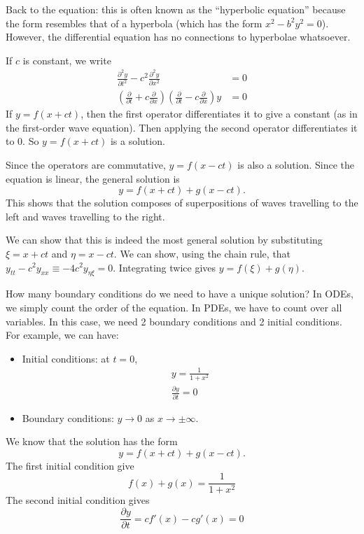 \documentclass[a4paper]{article}
\begin{document}
    Back to the equation: this is often known as the ``hyperbolic equation'' because the form resembles that of a hyperbola (which has the form $x^2 - b^2 y^2 = 0$). However, the differential equation has no connections to hyperbolae whatsoever.

    If $c$ is constant, we write
    \begin{align*}
      \frac{\partial ^2 y}{\partial t^2} - c^2 \frac{\partial^2 y}{\partial x^2} &= 0\\
      \left(\frac{\partial}{\partial t} + c\frac{\partial}{\partial x}\right)\left(\frac{\partial}{\partial t} - c\frac{\partial}{\partial x}\right) y &= 0
    \end{align*}
    If $y = f(x + ct)$, then the first operator differentiates it to give a constant (as in the first-order wave equation). Then applying the second operator differentiates it to $0$. So $y = f(x + ct)$ is a solution.

    Since the operators are commutative, $y = f(x - ct)$ is also a solution. Since the equation is linear, the general solution is
    \[
      y = f(x + ct) + g(x - ct).
    \]
    This shows that the solution composes of superpositions of waves travelling to the left and waves travelling to the right.

    \note We can show that this is indeed the most general solution by substituting $\xi = x + ct$ and $\eta = x - ct$. We can show, using the chain rule, that $y_{tt} - c^2 y_{xx} \equiv -4c^2 y_{\eta\xi} = 0$. Integrating twice gives $y = f(\xi) + g(\eta)$.

    How many boundary conditions do we need to have a unique solution? In ODEs, we simply count the order of the equation. In PDEs, we have to count over all variables. In this case, we need 2 boundary conditions and 2 initial conditions. For example, we can have:
    \begin{itemize}
      \item Initial conditions: at $t = 0$,
        \begin{gather*}
          y = \frac{1}{1 + x^2}\\
          \frac{\partial y}{\partial t} = 0
        \end{gather*}
      \item Boundary conditions: $y \to 0$ as $x \to \pm \infty$.
    \end{itemize}
    We know that the solution has the form 
    \[
      y = f(x + ct) + g(x - ct).
    \]
    The first initial condition give
    \[
      f(x) + g(x) = \frac{1}{1 + x^2}\tag{1}
    \]
    The second initial condition gives
    \[
      \frac{\partial y}{\partial t} = cf'(x) - cg'(x)\tag{2} = 0
    \]
\end{document}
